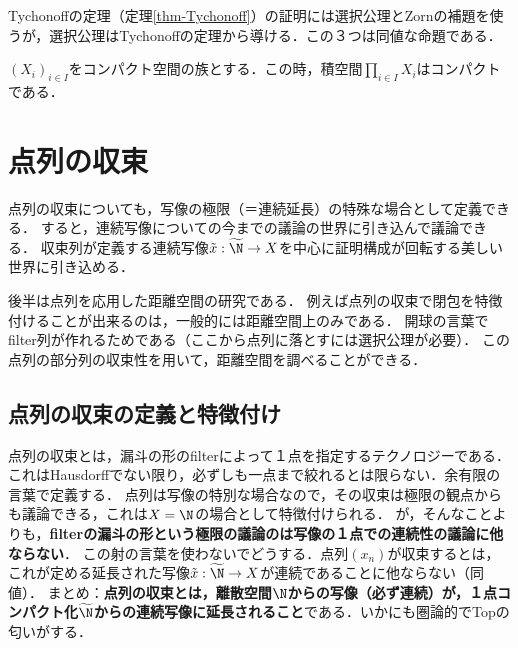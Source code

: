\documentclass[uplatex,dvipdfmx]{jsreport}
\newcommand{\wN}{\widetilde{\N}}
\renewcommand{\x}{\tilde{x}}
\begin{document}
\begin{remark}
    Tychonoffの定理（定理\ref{thm-Tychonoff}）の証明には選択公理とZornの補題を使うが，選択公理はTychonoffの定理から導ける．この３つは同値な命題である．
\end{remark}

\begin{theorem*}[Tychonoff]
    $(X_i)_{i\in I}$をコンパクト空間の族とする．この時，積空間$\prod_{i\in I}X_i$はコンパクトである．
\end{theorem*}

\section{点列の収束}

\begin{tcolorbox}[colframe=ForestGreen, colback=ForestGreen!10!white, breakable ,colbacktitle=ForestGreen!40!white, coltitle=black,fonttitle=\bfseries\sffamily
    ,title=点列の極限]
    点列の収束についても，写像の極限（＝連続延長）の特殊な場合として定義できる．
    すると，連続写像についての今までの議論の世界に引き込んで議論できる．
    収束列が定義する連続写像$\x:\wN\to X$を中心に証明構成が回転する美しい世界に引き込める．
    
    後半は点列を応用した距離空間の研究である．
    例えば点列の収束で閉包を特徴付けることが出来るのは，一般的には距離空間上のみである．
    開球の言葉でfilter列が作れるためである（ここから点列に落とすには選択公理が必要）．
    この点列の部分列の収束性を用いて，距離空間を調べることができる．
\end{tcolorbox}

\subsection{点列の収束の定義と特徴付け}

\begin{tcolorbox}[colframe=ForestGreen, colback=ForestGreen!10!white, breakable ,colbacktitle=ForestGreen!40!white, coltitle=black,fonttitle=\bfseries\sffamily
    ,title=点列の収束の議論は，延長された写像の連続性に落とす．]
    点列の収束とは，漏斗の形のfilterによって１点を指定するテクノロジーである．これはHausdorffでない限り，必ずしも一点まで絞れるとは限らない．余有限の言葉で定義する．
    点列は写像の特別な場合なので，その収束は極限の観点からも議論できる，これは$X=\N$の場合として特徴付けられる．
    が，そんなことよりも，\textbf{filterの漏斗の形という極限の議論のは写像の１点での連続性の議論に他ならない}．
    この射の言葉を使わないでどうする．点列$(x_n)$が収束するとは，これが定める延長された写像$\tilde{x}:\wN\to X$が連続であることに他ならない（同値）．
    まとめ：\textbf{点列の収束とは，離散空間$\N$からの写像（必ず連続）が，１点コンパクト化$\wN$からの連続写像に延長されること}である．いかにも圏論的でTopの匂いがする．
\end{tcolorbox}
\end{document}
